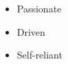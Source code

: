 %
%
%

\twocolumnsection
{
\begin{skills}
\end{skills}}
{
\vspace{1em}
\begin{itemize}
	\item Passionate
	\item Driven
    \item Self-reliant
\end{itemize}
}
